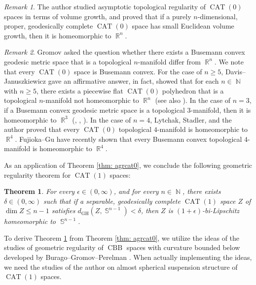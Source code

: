 \documentclass[a4paper,12pt]{amsart}
\newcommand{\CAT}{\operatorname{CAT}}
\newcommand{\CBB}{\operatorname{CBB}}
\newcommand{\R}{\operatorname{\mathbb{R}}}
\newcommand{\N}{\operatorname{\mathbb{N}}}
\newcommand{\Sph}{\operatorname{\mathbb{S}}}
\newcommand{\GH}{\operatorname{\mathrm{GH}}}
\numberwithin{equation}{section}
\theoremstyle{plain}
\newtheorem{thm}{Theorem}[section]
\theoremstyle{definition}
\theoremstyle{remark}
\newtheorem{rem}{Remark}[section]
\begin{document}
\begin{rem}
The author \cite{nagano5} studied asymptotic topological regularity
of $\CAT(0)$ spaces in terms of volume growth,
and proved that if a purely $n$-dimensional,
proper, geodesically complete $\CAT(0)$ space 
has small Euclidean volume growth,
then it is homeomorphic to $\R^n$.
\end{rem}

\begin{rem}
Gromov \cite{gromovq} asked the question whether 
there exists a Busemann convex geodesic metric space 
that is a topological $n$-manifold differ from $\R^n$.
We note that every $\CAT(0)$ space is Busemann convex.
For the case of $n \ge 5$,
Davis--Januszkiewicz \cite[Theorem 5b.1]{davis-januszkiewicz}
gave an affirmative answer,
in fact,
showed that for each $n \in \N$ with $n \ge 5$,
there exists a piecewise flat $\CAT(0)$ polyhedron
that is a topological $n$-manifold not homeomorphic to $\R^n$
(see also \cite{ancel-davis-guilbault}).
In the case of $n = 3$,
if a Busemann convex geodesic metric space 
is a topological $3$-manifold,
then it is homeomorphic to $\R^3$ 
(\cite{brown}, \cite{rolfsen}, \cite{thurston}).
In the case of $n = 4$,
Lytchak, Stadler, and the author \cite{lytchak-nagano-stadler}
proved that
every $\CAT(0)$ topological $4$-manifold
is homeomorphic to $\R^4$.
Fujioka--Gu \cite{fujioka-gu} have recently shown that
every Busemann convex topological $4$-manifold
is homeomorphic to $\R^4$.
\end{rem}

As an application of Theorem \ref{thm: agrcat0},
we conclude the following geometric regularity theorem
for $\CAT(1)$ spaces:

\begin{thm}
\label{thm: grcat1}
For every $\epsilon \in (0,\infty)$,
and for every $n \in \N$,
there exists $\delta \in (0,\infty)$ such that
if a separable, geodesically complete $\CAT(1)$ space $Z$
of $\dim Z \le n-1$ satisfies
$d_{\GH} \left( Z, \Sph^{n-1} \right) < \delta$,
then $Z$ is $(1+\epsilon)$-bi-Lipschitz homeomorphic to $\Sph^{n-1}$.
\end{thm}

To derive Theorem \ref{thm: grcat1} 
from Theorem \ref{thm: agrcat0},
we utilize the ideas of the studies 
of geometric regularity of $\CBB$ spaces
with curvature bounded below
developed by Burago--Gromov--Perelman 
\cite[Section 9]{burago-gromov-perelman}.
When actually implementing the ideas,
we need the studies of the author \cite{nagano6}
on almost spherical suspension structure of $\CAT(1)$ spaces.
\end{document}
